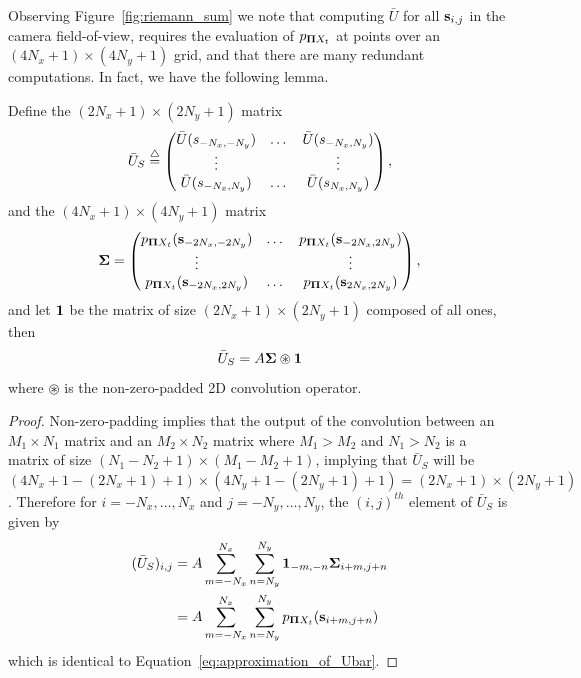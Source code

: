 Observing Figure~\ref{fig:riemann_sum} we note that computing $\bar{U}$ for all $\mathbf{s}_{i,j}$ in the camera field-of-view, requires the evaluation of $p_{\boldsymbol{\Pi} X_t}$ at points over an $(4N_x+1)\times(4N_y+1)$ grid, and that there are many redundant computations.  In fact, we have the following lemma.
\begin{lemma}
	Define the $(2N_x+1)\times(2N_y+1)$ matrix
	\[
	\bar{U}_S \stackrel{\triangle}{=} \begin{pmatrix}
						 \bar{U}(s_{-N_x,-N_y}) & \dots & \bar{U}(s_{-N_x,N_y}) \\
						 \vdots & & \vdots \\
						 \bar{U}(s_{-N_x,N_y}) & \dots & \bar{U}(s_{N_x,N_y})
                      \end{pmatrix},
	\]
	and the $(4N_x+1)\times(4N_y+1)$ matrix
	\[
		\boldsymbol{\Sigma} = \begin{pmatrix}  p_{\boldsymbol{\Pi} X_t}(\mathbf{s}_{-2N_x,-2N_y}) & \dots & p_{\boldsymbol{\Pi} X_t}(\mathbf{s}_{-2N_x,2N_y}) \\
                                    \vdots & & \vdots \\	
                                    p_{\boldsymbol{\Pi} X_t}(\mathbf{s}_{-2N_x,2N_y}) & \dots & p_{\boldsymbol{\Pi} X_t}(\mathbf{s}_{2N_x,2N_y})
                   \end{pmatrix},
	\]
	and let $\mathbf{1}$ be the matrix of size $(2N_x+1)\times(2N_y+1)$ composed of all ones, then
	\[
	\bar{U}_S = A \boldsymbol{\Sigma} \circledast \mathbf{1}
	\]
	where $\circledast$ is the non-zero-padded 2D convolution operator.
\end{lemma}
\begin{proof}
Non-zero-padding implies that the output of the convolution 	between an $M_1\times N_1$ matrix and an $M_2\times N_2$ matrix where $M_1>M_2$ and $N_1>N_2$ is a matrix of size $(N_1-N_2+1)\times(M_1-M_2+1)$, implying that $\bar{U}_S$ will be $(4N_x+1-(2N_x+1)+1)\times(4N_y+1-(2N_y+1)+1) = (2N_x+1)\times(2N_y+1)$.  Therefore for $i=-N_x,\dots,N_x$ and $j=-N_y,\dots,N_y$, the $(i,j)^{th}$ element of $\bar{U}_S$ is given by
	\begin{align*}
	(\bar{U}_S)_{i,j} &= A \sum_{m=-N_x}^{N_x} \sum_{n=N_y}^{N_y} \mathbf{1}_{-m,-n} \boldsymbol{\Sigma}_{i+m, j+n} \\
	                  &= A \sum_{m=-N_x}^{N_x} \sum_{n=N_y}^{N_y} p_{\boldsymbol{\Pi} X_t}(\mathbf{s}_{i+m, j+n})
	\end{align*}
	which is identical to Equation~\eqref{eq:approximation_of_Ubar}.
\end{proof}


